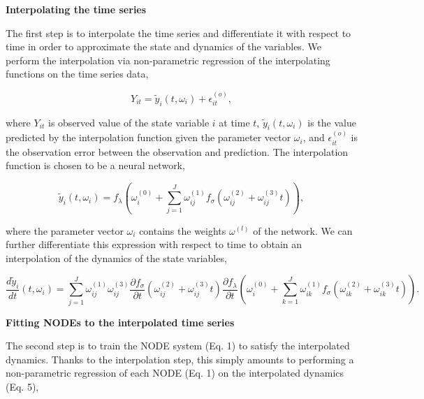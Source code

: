 \documentclass[11pt, oneside]{article}
\begin{document}
\textbf{Interpolating the time series}

The first step is to interpolate the time series and differentiate it with respect to time in order to approximate the state and dynamics of the variables.
We perform the interpolation via non-parametric regression of the interpolating functions on the time series data,

\vspace{-0.5cm}
\begin{equation}
    Y_{it} = \tilde{y}_i(t,\omega_i) + \epsilon^{(o)}_{it},
\end{equation}

where $Y_{it}$ is observed value of the state variable $i$ at time $t$, $\tilde{y}_i(t,\omega_i)$ is the value predicted by the interpolation function given the parameter vector $\omega_i$, and $\epsilon^{(o)}_{it}$ is the observation error between the observation and prediction. 
The interpolation function is chosen to be a neural network,

\vspace{-0.5cm}
\begin{equation}
    \tilde{y}_i (t,\omega_i) = f_\lambda \left( \omega_i^{(0)} + \sum_{j=1}^{J} \omega^{(1)}_{ij} f_\sigma \left( \omega^{(2)}_{ij} + \omega^{(3)}_{ij} t \right) \right),
\end{equation}

where the parameter vector $\omega_i$ contains the weights $\omega^{(l)}$ of the network.
We can further differentiate this expression with respect to time to obtain an interpolation of the dynamics of the state variables, 

\vspace{-0.5cm}
\begin{equation}
    \frac{d\tilde{y}_i}{dt} (t, \omega_i) = \sum_{j=1}^{J} \omega^{(1)}_{ij} \omega^{(3)}_{ij} \frac{\partial f_\sigma}{\partial t} \left(\omega^{(2)}_{ij} + \omega^{(3)}_{ij} t \right) \frac{\partial f_\lambda}{\partial t} \left ( \omega^{(0)}_{i} + \sum_{k=1}^{J} \omega^{(1)}_{ik} f_\sigma \left( \omega^{(2)}_{ik} + \omega^{(3)}_{ik} t \right) \right ). 
\end{equation}

\textbf{Fitting NODEs to the interpolated time series}

The second step is to train the NODE system (Eq. 1) to satisfy the interpolated dynamics.
Thanks to the interpolation step, this simply amounts to performing a non-parametric regression of each NODE (Eq. 1) on the interpolated dynamics (Eq. 5),
\end{document}
